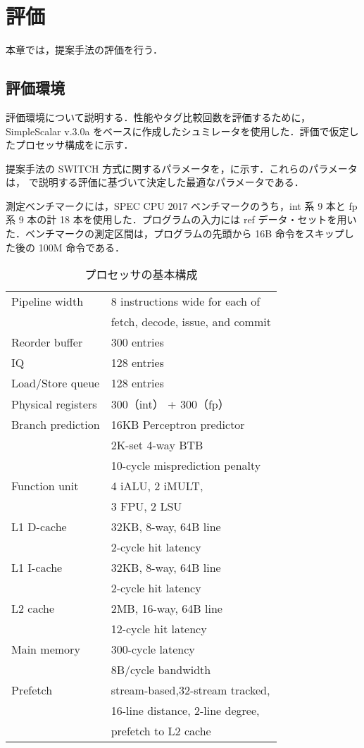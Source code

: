 
\chapter{評価}
\label{sec:eval}
本章では，提案手法の評価を行う．

\section{評価環境}
\label{sec:eval_env}
評価環境について説明する．性能やタグ比較回数を評価するために，SimpleScalar v.3.0a をベースに作成したシュミレータを使用した．評価で仮定したプロセッサ構成をに示す．

提案手法の SWITCH 方式に関するパラメータを，に示す．これらのパラメータは， で説明する評価に基づいて決定した最適なパラメータである．

測定ベンチマークには，SPEC CPU 2017 ベンチマークのうち，int 系 9 本と fp 系 9 本の計 18 本を使用した．プログラムの入力には ref データ・セットを用いた．ベンチマークの測定区間は，プログラムの先頭から 16B 命令をスキップした後の 100M 命令である．

\begin{table}[htb]
  \caption{プロセッサの基本構成}
  \footnotesize
  \center
    \begin{tabular}{l|l} \hline \hline
     Pipeline width & 8 instructions wide for each of \\
     & fetch, decode, issue, and commit \\
     Reorder buffer & 300 entries \\
     IQ & 128 entries \\
     Load/Store queue & 128 entries \\
     Physical registers & 300（int） + 300（fp） \\
     Branch prediction & 16KB Perceptron predictor~\cite{Jimenez2001} \\
     & 2K-set 4-way BTB \\
     & 10-cycle misprediction penalty \\
     Function unit & 4 iALU, 2 iMULT, \\
     &  3 FPU, 2 LSU \\
     L1 D-cache & 32KB, 8-way, 64B line \\
      & 2-cycle hit latency \\
     L1 I-cache & 32KB, 8-way, 64B line \\
      &  2-cycle hit latency \\
     L2 cache & 2MB, 16-way, 64B line \\
      & 12-cycle hit latency \\  
     Main memory & 300-cycle latency \\
     & 8B/cycle bandwidth \\ 
     Prefetch & stream-based,32-stream tracked,  \\ 
     & 16-line distance, 2-line degree, \\
     & prefetch to L2 cache \\ \hline
  \end{tabular}
  \label{tab:base_config}
\end{table}

